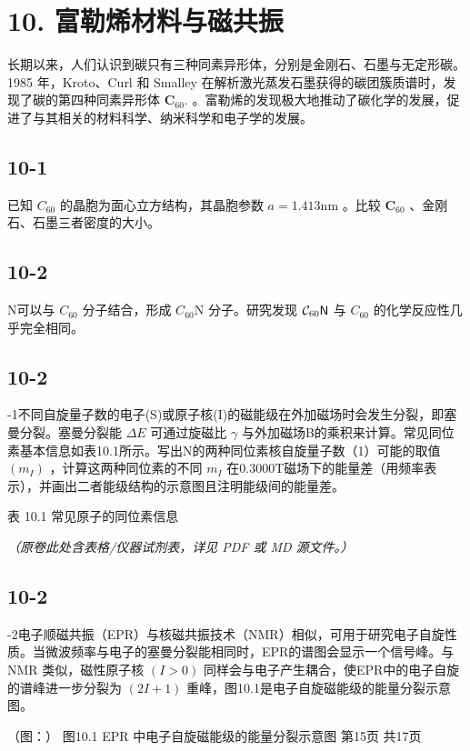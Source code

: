 \section*{10. 富勒烯材料与磁共振}
长期以来，人们认识到碳只有三种同素异形体，分别是金刚石、石墨与无定形碳。1985 年，Kroto、Curl 和 Smalley 在解析激光蒸发石墨获得的碳团簇质谱时，发现了碳的第四种同素异形体 $\mathbf { C } _ { 6 0 } .$ 。富勒烯的发现极大地推动了碳化学的发展，促进了与其相关的材料科学、纳米科学和电子学的发展。

\subsection*{10-1}
已知 $C _ { 6 0 }$ 的晶胞为面心立方结构，其晶胞参数 $a = 1 . 4 1 3 \mathrm { n m }$ 。比较 $\mathbf { C } _ { 6 0 }$ 、金刚石、石墨三者密度的大小。

\subsection*{10-2}
N可以与 $C _ { 6 0 }$ 分子结合，形成 ${ { C } _ { 6 0 } } \mathrm { { N } }$ 分子。研究发现 ${ \cal C } _ { 6 0 } \mathsf { N }$ 与 ${ C } _ { 6 0 }$ 的化学反应性几乎完全相同。

\subsection*{10-2}
-1不同自旋量子数的电子(S)或原子核(I)的磁能级在外加磁场时会发生分裂，即塞曼分裂。塞曼分裂能 $\Delta E$ 可通过旋磁比 $\gamma$ 与外加磁场B的乘积来计算。常见同位素基本信息如表10.1所示。写出N的两种同位素核自旋量子数（1）可能的取值$( m _ { I } )$ ，计算这两种同位素的不同 $m _ { I }$ 在0.3000T磁场下的能量差（用频率表示），并画出二者能级结构的示意图且注明能级间的能量差。

表 10.1 常见原子的同位素信息

\textit{（原卷此处含表格/仪器试剂表，详见 PDF 或 MD 源文件。）}

\subsection*{10-2}
-2电子顺磁共振（EPR）与核磁共振技术（NMR）相似，可用于研究电子自旋性质。当微波频率与电子的塞曼分裂能相同时，EPR的谱图会显示一个信号峰。与NMR 类似，磁性原子核 $( I > 0 )$ 同样会与电子产生耦合，使EPR中的电子自旋的谱峰进一步分裂为 $( 2 I + 1 )$ 重峰，图10.1是电子自旋磁能级的能量分裂示意图。

（图：）
图10.1 EPR 中电子自旋磁能级的能量分裂示意图
第15页 共17页

